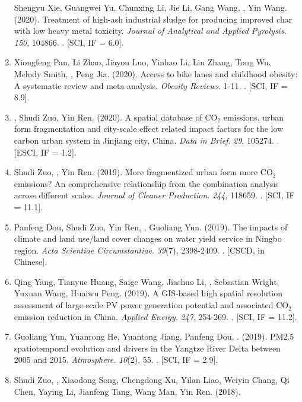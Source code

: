 \begin{enumerate}
    Shengyu Xie, Guangwei Yu, Chunxing Li, Jie Li, Gang Wang, \Shaoqing, Yin Wang. (2020).
    Treatment of high-ash industrial sludge for producing improved char with low heavy metal toxicity.
    \textit{Journal of Analytical and Applied Pyrolysis}. \textit{150}, 104866.
    . [SCI, IF = 6.0].
\item
    Xiongfeng Pan, Li Zhao, Jiayou Luo, Yinhao Li, Lin Zhang, Tong Wu, Melody Smith, \Shaoqing, Peng Jia. (2020).
    Access to bike lanes and childhood obesity: A systematic review and meta‐analysis.
    \textit{Obesity Reviews}. 1-11.
    . [SCI, IF = 8.9].
\item
    \Shaoqing, Shudi Zuo, Yin Ren. (2020).
    A spatial database of CO$_2$ emissions, urban form fragmentation and city-scale effect related impact factors for the low carbon urban system in Jinjiang city, China.
    \textit{Data in Brief}. \textit{29}, 105274.
    . [ESCI, IF = 1.2].
\item
    Shudi Zuo, \Shaoqing, Yin Ren. (2019).
    More fragmentized urban form more CO$_2$ emissions? An comprehensive relationship from the combination analysis across different scales.
    \textit{Journal of Cleaner Production}. \textit{244}, 118659.
    . [SCI, IF = 11.1].
\item
    Panfeng Dou, Shudi Zuo, Yin Ren, \Shaoqing, Guoliang Yun. (2019).
    The impacts of climate and land use/land cover changes on water yield service in Ningbo region.
    \textit{Acta Scientiae Circumstantiae}. \textit{39}(7), 2398-2409.
    . [CSCD, in Chinese].
\item
    Qing Yang, Tianyue Huang, Saige Wang, Jiashuo Li, \Shaoqing, Sebastian Wright, Yuxuan Wang, Huaiwu Peng. (2019).
    A GIS-based high spatial resolution assessment of large-scale PV power generation potential and associated CO$_2$ emission reduction in China.
    \textit{Applied Energy}. \textit{247}, 254-269.
    . [SCI, IF = 11.2].
\item
    Guoliang Yun, Yuanrong He, Yuantong Jiang, Panfeng Dou, \Shaoqing. (2019).
    PM2.5 spatiotemporal evolution and drivers in the Yangtze River Delta between 2005 and 2015.
    \textit{Atmosphere}. \textit{10}(2), 55.
    . [SCI, IF = 2.9].
\item
    Shudi Zuo, \Shaoqing, Xiaodong Song, Chengdong Xu, Yilan Liao, Weiyin Chang, Qi Chen, Yaying Li, Jianfeng Tang, Wang Man, Yin Ren. (2018).

\end{enumerate}
